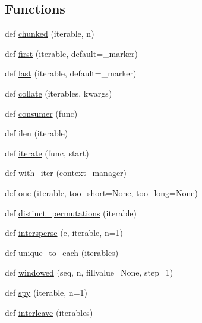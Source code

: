\subsection*{Functions}
\begin{DoxyCompactItemize}
\item 
def \hyperlink{namespacemore__itertools_1_1more_af5f7231fe2247dfc60f3874bca18eacd}{chunked} (iterable, n)
\item 
def \hyperlink{namespacemore__itertools_1_1more_a11b798d0988ce255f2c16ed2d0ccedd4}{first} (iterable, default=\+\_\+marker)
\item 
def \hyperlink{namespacemore__itertools_1_1more_a45c76219dda8923e65c5c2ce77cb0eaa}{last} (iterable, default=\+\_\+marker)
\item 
def \hyperlink{namespacemore__itertools_1_1more_a9a4d717c2317a68b98a03ad1ca1c663b}{collate} (iterables, kwargs)
\item 
def \hyperlink{namespacemore__itertools_1_1more_a52fff63ce0cd61f83bba85e17fc8bd32}{consumer} (func)
\item 
def \hyperlink{namespacemore__itertools_1_1more_a207b63f7eabe26b6bbcfb8d5906c99b6}{ilen} (iterable)
\item 
def \hyperlink{namespacemore__itertools_1_1more_a071f4513345c1187be5fc1cb8ea729f4}{iterate} (func, start)
\item 
def \hyperlink{namespacemore__itertools_1_1more_ae3315463ad9b84adbec0866ec2103519}{with\+\_\+iter} (context\+\_\+manager)
\item 
def \hyperlink{namespacemore__itertools_1_1more_a31cba1169ac37989c9c9e24c32bc8e3f}{one} (iterable, too\+\_\+short=None, too\+\_\+long=None)
\item 
def \hyperlink{namespacemore__itertools_1_1more_af95310ce2a768acac94f5ae319f24b8f}{distinct\+\_\+permutations} (iterable)
\item 
def \hyperlink{namespacemore__itertools_1_1more_ab3e64108ca2dffa1a983a124fecdf8e2}{intersperse} (e, iterable, n=1)
\item 
def \hyperlink{namespacemore__itertools_1_1more_af089b69b0ff8567b619e80602740fbda}{unique\+\_\+to\+\_\+each} (iterables)
\item 
def \hyperlink{namespacemore__itertools_1_1more_a711770e48f02edd5a51d08a435083bdd}{windowed} (seq, n, fillvalue=None, step=1)
\item 
def \hyperlink{namespacemore__itertools_1_1more_a71a959b7e87fad38c9fb6afe150d89fa}{spy} (iterable, n=1)
\item 
def \hyperlink{namespacemore__itertools_1_1more_abd98071367f1d445e6fdc1237a76562d}{interleave} (iterables)

\end{DoxyCompactItemize}
